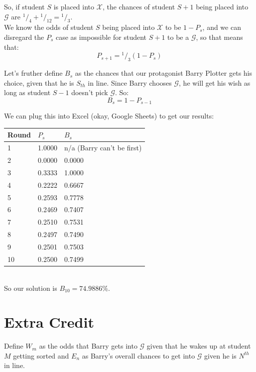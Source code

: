 \documentclass[10pt, letterpaper]{article}
\newcommand*\rfrac[2]{{}^{#1}\!/_{#2}}
\begin{document}
So, if student $S$ is placed into $\mathcal{X}$, the chances of student $S+1$ being placed into $\mathcal{G}$ are
$\rfrac{1}{4} + \rfrac{1}{12} = \rfrac{1}{3}$.\\

We know the odds of student $S$ being placed into $\mathcal{X}$ to be $1-P_s$, and we can disregard the $P_s$ case as impossible for student $S+1$ to be a $\mathcal{G}$, so that means that:
\begin{equation*}
    P_{s+1} = \rfrac{1}{3}(1 - P_s)
\end{equation*}

Let's fruther define $B_s$ as the chances that our protagonist Barry Plotter gets his choice, given that he is $S_{th}$ in line.
Since Barry chooses $\mathcal{G}$, he will get his wish as long as student $S-1$ doesn't pick $\mathcal{G}$. So:
\begin{equation*}
    B_s = 1 - P_{s-1}
\end{equation*}

We can plug this into Excel (okay, Google Sheets) to get our results:\\

\begin{tabular}{l | l | l }
    Round   & $P_s$     & $B_s$ \\ \hline
    1       & 1.0000    & n/a (Barry can't be first)\\
    2       & 0.0000    & 0.0000 \\
    3       & 0.3333    & 1.0000 \\
    4       & 0.2222    & 0.6667 \\
    5       & 0.2593    & 0.7778 \\
    6       & 0.2469    & 0.7407 \\
    7       & 0.2510    & 0.7531 \\
    8       & 0.2497    & 0.7490 \\
    9       & 0.2501    & 0.7503 \\
    10      & 0.2500    & 0.7499 \\
\end{tabular}\\

So our solution is $B_{10} = 74.9886\%$.

\section*{Extra Credit}

Define $W_m$ as the odds that Barry gets into $\mathcal{G}$ given that he wakes up at student $M$ getting sorted
and $E_n$ as Barry's overall chances to get into $\mathcal{G}$ given he is $N^{th}$ in line.\\
\end{document}
